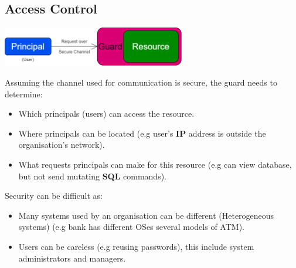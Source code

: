 \subsection{Access Control}
\begin{center}\includegraphics[width=0.6\textwidth]{network_security/images/access control.png}\end{center}
Assuming the channel used for communication is secure, the guard needs to determine:
\begin{itemize}
    \setlength\itemsep{0em}
    \item Which principals (users) can access the resource.
    \item Where principals can be located (e.g user's \textbf{IP} address is outside the organisation's network).
    \item What requests principals can make for this resource (e.g can view database, but not send mutating \textbf{SQL} commands).
\end{itemize}
Security can be difficult as:
\begin{itemize}
    \setlength\itemsep{0em}
    \item Many systems used by an organisation can be different (Heterogeneous systems) (e.g bank has different OSes several models of ATM).
    \item Users can be careless (e.g reusing passwords), this include system administrators and managers.
\end{itemize}
